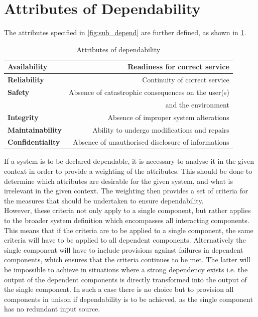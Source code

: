 \section{Attributes of Dependability}
The attributes specified in \cref{fig:sub_depend} are further defined, as shown in \cref{tbl:rts_depend_crit}.

\begin{table}[ht]
  \centering
  \begin{tabular}{|l|r|}
  \hline
    \textbf{Availability} & Readiness for correct service \\ \hline
    \textbf{Reliability} & Continuity of correct service \\ \hline
    \textbf{Safety} & Absence of catastrophic consequences on the user(s) \\ & and the environment \\ \hline
    \textbf{Integrity} & Absence of improper system alterations \\ \hline
    \textbf{Maintainability} & Ability to undergo modifications and repairs \\ \hline
    \textbf{Confidentiality} & Absence of unauthorised disclosure of informations \\ \hline
  \end{tabular}
  \caption{Attributes of dependability\cite{rts_depend}}
  \label{tbl:rts_depend_crit}
\end{table}

If a system is to be declared dependable, it is necessary to analyse it in the given context in order to provide a weighting of the attributes.
This should be done to determine which attributes are desirable for the given system, and what is irrelevant in the given context.
The weighting then provides a set of criteria for the measures that should be undertaken to ensure dependability.\\
However, these criteria not only apply to a single component, but rather applies to the broader system definition which encompasses all interacting components.
This means that if the criteria are to be applied to a single component, the same criteria will have to be applied to all dependent components.
Alternatively the single component will have to include provisions against failures in dependent components, which ensures that the criteria continues to be met.
The latter will be impossible to achieve in situations where a strong dependency exists i.e. the output of the dependent components is directly transformed into the output of the single component.
In such a case there is no choice but to provision all components in unison if dependability is to be achieved, as the single component has no redundant input source.

